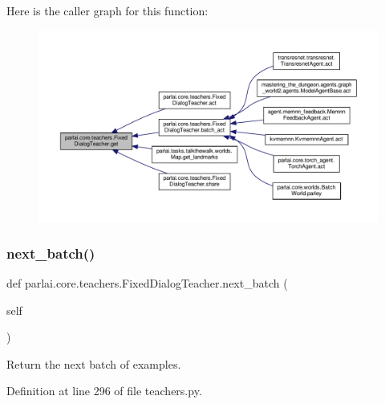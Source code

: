 Here is the caller graph for this function\+:
\nopagebreak
\begin{figure}[H]
\begin{center}
\leavevmode
\includegraphics[width=350pt]{classparlai_1_1core_1_1teachers_1_1FixedDialogTeacher_a7c4cbfbe5cf6e9dbdf8c00d140ef4e7e_icgraph}
\end{center}
\end{figure}
\mbox{\label{classparlai_1_1core_1_1teachers_1_1FixedDialogTeacher_a49100faf9af79c6e24ddac9e36151d54}} 
\subsubsection{\texorpdfstring{next\+\_\+batch()}{next\_batch()}}
{\footnotesize\ttfamily def parlai.\+core.\+teachers.\+Fixed\+Dialog\+Teacher.\+next\+\_\+batch (\begin{DoxyParamCaption}\item[{}]{self }\end{DoxyParamCaption})}

\begin{DoxyVerb}Return the next batch of examples.\end{DoxyVerb}
 

Definition at line 296 of file teachers.\+py.



